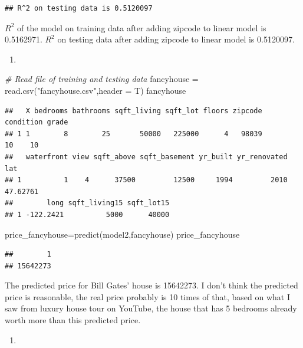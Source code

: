 \documentclass[
]{article}
\newenvironment{Shaded}{\begin{snugshade}}{\end{snugshade}}
\newcommand{\AttributeTok}[1]{\textcolor[rgb]{0.77,0.63,0.00}{#1}}
\newcommand{\CommentTok}[1]{\textcolor[rgb]{0.56,0.35,0.01}{\textit{#1}}}
\newcommand{\FunctionTok}[1]{\textcolor[rgb]{0.00,0.00,0.00}{#1}}
\newcommand{\NormalTok}[1]{#1}
\newcommand{\OtherTok}[1]{\textcolor[rgb]{0.56,0.35,0.01}{#1}}
\newcommand{\StringTok}[1]{\textcolor[rgb]{0.31,0.60,0.02}{#1}}
\providecommand{\tightlist}{%
  \setlength{\itemsep}{0pt}\setlength{\parskip}{0pt}}
\begin{document}
\begin{verbatim}
## R^2 on testing data is 0.5120097
\end{verbatim}

\(R^2\) of the model on training data after adding zipcode to linear
model is 0.5162971. \(R^2\) on testing data after adding zipcode to
linear model is 0.5120097.

\begin{enumerate}
\def\labelenumi{(\alph{enumi})}
\setcounter{enumi}{4}
\tightlist
\item
\end{enumerate}

\begin{Shaded}
\begin{Highlighting}[]
\CommentTok{\# Read file of training and testing data}
\NormalTok{fancyhouse }\OtherTok{=} \FunctionTok{read.csv}\NormalTok{(}\StringTok{"fancyhouse.csv"}\NormalTok{,}\AttributeTok{header =}\NormalTok{ T)}
\NormalTok{fancyhouse}
\end{Highlighting}
\end{Shaded}

\begin{verbatim}
##   X bedrooms bathrooms sqft_living sqft_lot floors zipcode condition grade
## 1 1        8        25       50000   225000      4   98039        10    10
##   waterfront view sqft_above sqft_basement yr_built yr_renovated      lat
## 1          1    4      37500         12500     1994         2010 47.62761
##        long sqft_living15 sqft_lot15
## 1 -122.2421          5000      40000
\end{verbatim}

\begin{Shaded}
\begin{Highlighting}[]
\NormalTok{price\_fancyhouse}\OtherTok{=}\FunctionTok{predict}\NormalTok{(model2,fancyhouse)}
\NormalTok{price\_fancyhouse}
\end{Highlighting}
\end{Shaded}

\begin{verbatim}
##        1 
## 15642273
\end{verbatim}

The predicted price for Bill Gates' house is 15642273. I don't think the
predicted price is reasonable, the real price probably is 10 times of
that, based on what I saw from luxury house tour on YouTube, the house
that has 5 bedrooms already worth more than this predicted price.

\begin{enumerate}
\def\labelenumi{(\alph{enumi})}
\setcounter{enumi}{5}
\tightlist
\item
\end{enumerate}
\end{document}
